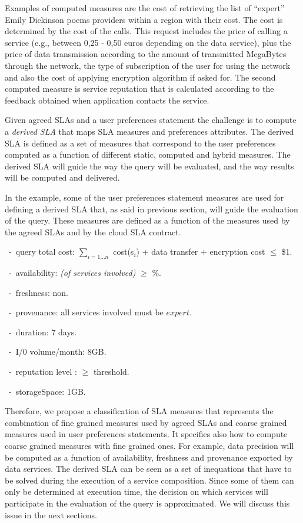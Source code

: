 Examples of computed measures are the cost of retrieving the list of ``expert'' Emily Dickinson poems providers within a region with their cost. 
The cost is determined by the  cost of the calls. 
This request  includes the price of calling a service (e.g.,  between 0,25 - 0,50 euros depending on the data service), plus the price of data transmission according to the amount of transmitted MegaBytes through the network, the type of subscription of the user for using the network and also the cost of applying encryption algorithm if asked for. The second computed measure is service reputation that is calculated according to the feedback obtained when application contacts the service.

Given agreed SLAs and a user preferences statement the challenge is to compute a  {\em derived SLA} that  maps SLA measures and preferences attributes.  
The derived SLA is defined as a set of measures that correspond to the user preferences computed as a function of different static, computed and hybrid measures. 
The derived SLA  will guide the way the query will be evaluated, and the way results will be computed and delivered.

In the example, some of the user preferences statement measures are used for defining a derived SLA that, as said in previous section, will guide the evaluation of the query. 
These measures are defined as a function of the measures used by the agreed SLAs and by the cloud SLA contract.
\begin{trivlist}\sf\footnotesize
 \item[~-~query total cost:] $\sum_{i = 1\dots n}$ cost(s$_i$) + data transfer + encryption cost $\leq$ \$1.
 \item[~-~availability:] {\em (of services involved)} $\geq$ {$\%$}.
 \item[~-~freshness:] non.
 \item[~-~provenance:] all services involved must be $expert$.
 \item[~-~duration:] 7 days.
 \item[~-~I/0 volume/month:] 8GB.
 \item[~-~reputation level :] $\geq$ threshold.
 \item[~-~storageSpace:] 1GB.
 \end{trivlist} 
 
Therefore, we propose a classification of SLA measures that represents the combination of fine grained measures used by agreed SLAs and coarse grained measures used in user preferences statements. 
It specifies also how to compute coarse grained measures with fine grained ones. 
For example, data precision will be computed as a function of availability, freshness and provenance exported by data services. The derived SLA can be seen as a set of inequations that have to be solved during the execution of a service composition. Since some of them can only be determined at execution time, the decision on which services will participate in the evaluation of the query is approximated. We will discuss this issue in the next sections.

